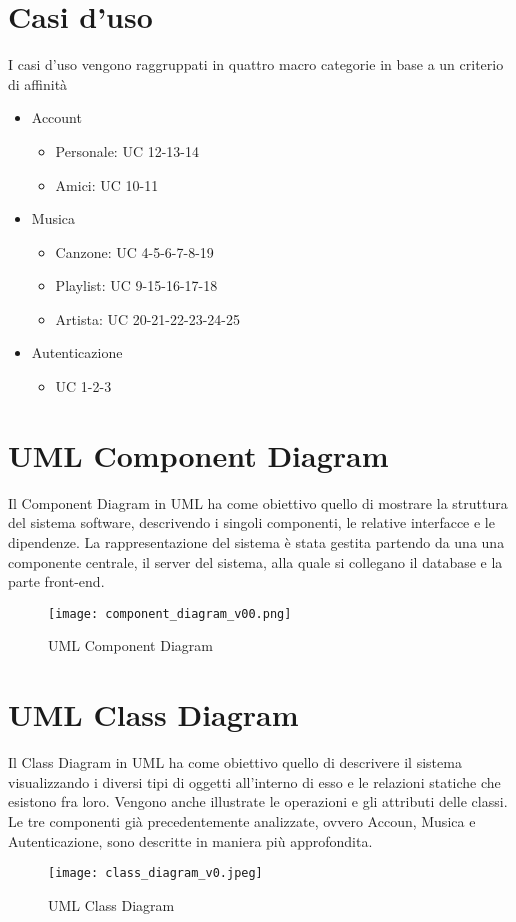 \section{Casi d'uso}
I casi d'uso vengono raggruppati in quattro macro categorie in base a un criterio di affinità
\begin{itemize}
    \item Account
    \begin{itemize}
        \item Personale: UC 12-13-14
        \item Amici: UC 10-11
    \end{itemize}
    \item Musica
    \begin{itemize}
        \item Canzone: UC 4-5-6-7-8-19
        \item Playlist: UC 9-15-16-17-18
        \item Artista: UC 20-21-22-23-24-25
    \end{itemize}
    \item Autenticazione
    \begin{itemize}
        \item UC 1-2-3
    \end{itemize}
\end{itemize}




\newpage
\section{UML Component Diagram}
Il Component Diagram in UML ha come obiettivo quello di mostrare la struttura
del sistema software, descrivendo i singoli componenti, le relative interfacce 
e le dipendenze. 
La rappresentazione del sistema è stata gestita partendo da una
una componente centrale, il server del sistema, alla quale si collegano il database e la parte front-end.


\begin{figure}[H]
    \centering
    \texttt{[image: component\_diagram\_v00.png]}
    \caption{UML Component Diagram}
    \label{fig-uml-component-diag}
\end{figure}



\newpage
\section{UML Class Diagram}
Il Class Diagram in UML ha come obiettivo quello di descrivere il sistema 
visualizzando i diversi tipi di oggetti all'interno di esso e le relazioni 
statiche che esistono fra loro. Vengono anche illustrate le operazioni e 
gli attributi delle classi. 
Le tre componenti già precedentemente analizzate, ovvero Accoun, Musica e 
Autenticazione, sono descritte in maniera più approfondita.
\begin{figure}[H]
    \centering
    \texttt{[image: class\_diagram\_v0.jpeg]}
    \caption{UML Class Diagram}
    \label{fig-uml-class-diag}
\end{figure}

